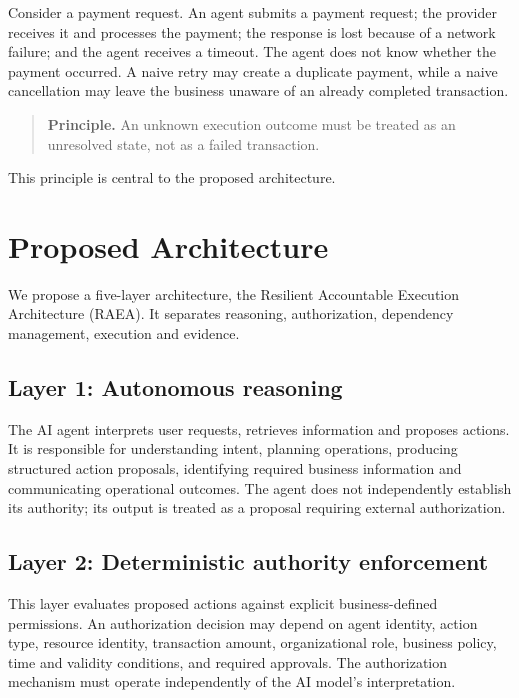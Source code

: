 \documentclass[11pt,a4paper]{article}
\newcommand{\RAEA}{Resilient Accountable Execution Architecture (RAEA)}
\begin{document}
Consider a payment request. An agent submits a payment request; the provider receives it and processes the payment; the response is lost because of a network failure; and the agent receives a timeout. The agent does not know whether the payment occurred. A naive retry may create a duplicate payment, while a naive cancellation may leave the business unaware of an already completed transaction.

\begin{quote}
\textbf{Principle.} An unknown execution outcome must be treated as an unresolved state, not as a failed transaction.
\end{quote}

This principle is central to the proposed architecture.

\section{Proposed Architecture}

We propose a five-layer architecture, the \RAEA{}. It separates reasoning, authorization, dependency management, execution and evidence.

\subsection{Layer 1: Autonomous reasoning}

The AI agent interprets user requests, retrieves information and proposes actions. It is responsible for understanding intent, planning operations, producing structured action proposals, identifying required business information and communicating operational outcomes. The agent does not independently establish its authority; its output is treated as a proposal requiring external authorization.

\subsection{Layer 2: Deterministic authority enforcement}

This layer evaluates proposed actions against explicit business-defined permissions. An authorization decision may depend on agent identity, action type, resource identity, transaction amount, organizational role, business policy, time and validity conditions, and required approvals. The authorization mechanism must operate independently of the AI model's interpretation.
\end{document}
